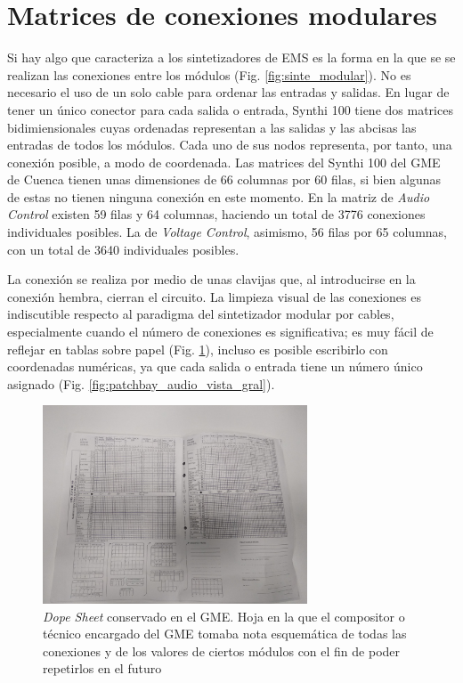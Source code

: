 \section{Matrices de conexiones modulares}

Si hay algo que caracteriza a los sintetizadores de EMS es la forma en la que se se realizan las conexiones entre los módulos (Fig. \ref{fig:sinte_modular}). No es necesario el uso de un solo cable para ordenar las entradas y salidas. En lugar de tener un único conector para cada salida o entrada, Synthi 100 tiene dos matrices bidimiensionales cuyas ordenadas representan a las salidas y las abcisas las entradas de todos los módulos. Cada uno de sus nodos representa, por tanto, una conexión posible, a modo de coordenada. Las matrices del Synthi 100 del GME de Cuenca tienen unas dimensiones de 66 columnas por 60 filas, si bien algunas de estas no tienen ninguna conexión en este momento. En la matriz de \textit{Audio Control} existen 59 filas y 64 columnas, haciendo un total de 3776 conexiones individuales posibles. La de \textit{Voltage Control}, asimismo, 56 filas por 65 columnas, con un total de 3640 individuales posibles.

La conexión se realiza por medio de unas clavijas que, al introducirse en la conexión hembra, cierran el circuito. La limpieza visual de las conexiones es indiscutible respecto al paradigma del sintetizador modular por cables, especialmente cuando el número de conexiones es significativa; es muy fácil de reflejar en tablas sobre papel (Fig. \ref{fig:dope_sheet_GME}), incluso es posible escribirlo con coordenadas numéricas, ya que cada salida o entrada tiene un número único asignado (Fig. \ref{fig:patchbay_audio_vista_gral}).

\begin{figure}
	\centering
	\includegraphics[width=0.7\textwidth]{images/dope_sheet_GME}
	\caption[\textit{Dope Sheet} conservado en el GME]{\textit{Dope Sheet} conservado en el GME. Hoja en la que el compositor o técnico encargado del GME tomaba nota esquemática de todas las conexiones y de los valores de ciertos módulos con el fin de poder repetirlos en el futuro}
	\label{fig:dope_sheet_GME}
\end{figure}


